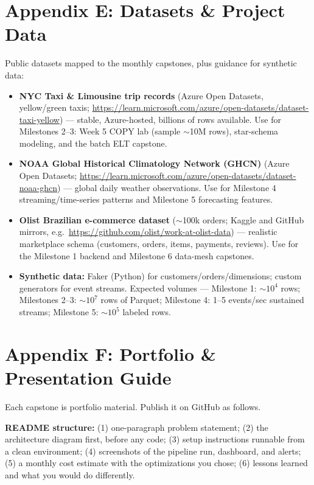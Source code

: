 \documentclass[11pt, a4paper]{article}
\begin{document}
\section{Appendix E: Datasets \& Project Data}
Public datasets mapped to the monthly capstones, plus guidance for synthetic data:

\begin{itemize}[label=-]
    \item \textbf{NYC Taxi \& Limousine trip records} (Azure Open Datasets, yellow/green taxis; \url{https://learn.microsoft.com/azure/open-datasets/dataset-taxi-yellow}) --- stable, Azure-hosted, billions of rows available. Use for Milestones 2--3: Week 5 COPY lab (sample $\sim$10M rows), star-schema modeling, and the batch ELT capstone.
    \item \textbf{NOAA Global Historical Climatology Network (GHCN)} (Azure Open Datasets; \url{https://learn.microsoft.com/azure/open-datasets/dataset-noaa-ghcn}) --- global daily weather observations. Use for Milestone 4 streaming/time-series patterns and Milestone 5 forecasting features.
    \item \textbf{Olist Brazilian e-commerce dataset} ($\sim$100k orders; Kaggle and GitHub mirrors, e.g.\ \url{https://github.com/olist/work-at-olist-data}) --- realistic marketplace schema (customers, orders, items, payments, reviews). Use for the Milestone 1 backend and Milestone 6 data-mesh capstones.
    \item \textbf{Synthetic data:} Faker (Python) for customers/orders/dimensions; custom generators for event streams. Expected volumes --- Milestone 1: $\sim$$10^4$ rows; Milestones 2--3: $\sim$$10^7$ rows of Parquet; Milestone 4: 1--5 events/sec sustained streams; Milestone 5: $\sim$$10^5$ labeled rows.
\end{itemize}

\section{Appendix F: Portfolio \& Presentation Guide}
Each capstone is portfolio material. Publish it on GitHub as follows.

\textbf{README structure:} (1) one-paragraph problem statement; (2) the architecture diagram first, before any code; (3) setup instructions runnable from a clean environment; (4) screenshots of the pipeline run, dashboard, and alerts; (5) a monthly cost estimate with the optimizations you chose; (6) lessons learned and what you would do differently.
\end{document}
